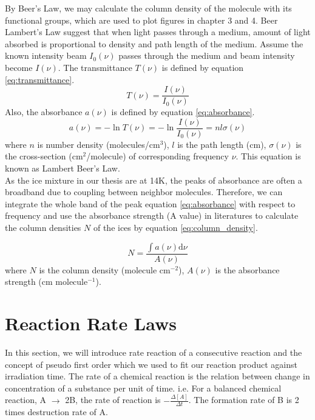 By Beer’s Law, we may calculate the column density of the molecule with its functional groups, which are used to plot figures in chapter 3 and 4. Beer Lambert’s Law suggest that when light passes through a medium, amount of light absorbed is proportional to density and path length of the medium. Assume the known intensity beam $I_{0}(\nu)$ passes through the medium and beam intensity become $I(\nu)$. The transmittance $T(\nu)$ is defined by equation \ref{eq:transmittance}. \\
\begin{equation}
T(\nu) = \frac{I(\nu)}{I_{0}(\nu)}
\label{eq:transmittance}
\end{equation}
Also, the absorbance $a(\nu)$ is defined by equation \ref{eq:absorbance}. \\
\begin{equation}
a(\nu) = - \ln T(\nu) = - \ln \frac{I(\nu)}{I_{0}(\nu)} = n l \sigma(\nu)
\label{eq:absorbance}
\end{equation}
where $n$ is number density (molecules/cm$^3$), $l$ is the path length (cm), $\sigma(\nu)$ is the cross-section (cm$^2$/molecule) of corresponding frequency $\nu$. This equation is known as Lambert Beer’s Law. \\

As the ice mixture in our thesis are at 14K, the peaks of absorbance are often a broadband due to coupling between neighbor molecules. Therefore, we can integrate the whole band of the peak equation \ref{eq:absorbance} with respect to frequency and use the absorbance strength (A value) in literatures to calculate the column densities $N$ of the ices by equation \ref{eq:column_density}.

\begin{equation}
N = \frac{\int a(\nu) \mathrm{d}\nu}{A(\nu)}
\label{eq:column_density}
\end{equation}
where $N$ is the column density (molecule cm$^{-2}$), $A(\nu)$ is the absorbance strength (cm molecule$^{-1}$).

\section{Reaction Rate Laws}
\label{sec:Reaction_Rate_Laws}
In this section, we will introduce rate reaction of a consecutive reaction and the concept of pseudo first order which we used to fit our reaction product against irradiation time. The rate of a chemical reaction is the relation between change in concentration of a substance per unit of time. i.e. For a balanced chemical reaction, A $\rightarrow$ 2B, the rate of reaction is $- \frac{\Delta [A]}{\Delta t}$. The formation rate of B is 2 times destruction rate of A.


